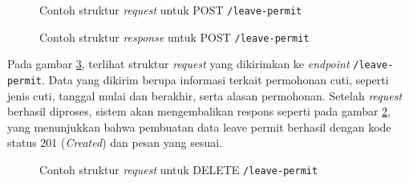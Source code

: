 \begin{figure}
    \centering
    \caption{Contoh struktur \textit{request} untuk POST \texttt{/leave-permit}}
    \label{fig:request_leave_permit}
\end{figure}
\begin{figure}
    \centering
    \caption{Contoh struktur \textit{response} untuk POST \texttt{/leave-permit}}
    \label{fig:response_leave_permit}
\end{figure}
Pada gambar \ref{fig:request_leave_permit}, terlihat struktur \textit{request} yang dikirimkan ke \textit{endpoint} \texttt{/leave-permit}. Data yang dikirim berupa informasi terkait permohonan cuti, seperti jenis cuti, tanggal mulai dan berakhir, serta alasan permohonan. Setelah \textit{request} berhasil diproses, sistem akan mengembalikan respons seperti pada gambar \ref{fig:response_leave_permit}, yang menunjukkan bahwa pembuatan data leave permit berhasil dengan kode status 201 (\textit{Created}) dan pesan yang sesuai.

\begin{figure}
    \centering
    \caption{Contoh struktur \textit{request} untuk DELETE \texttt{/leave-permit}}
    \label{fig:request_leave_permit}
\end{figure}

